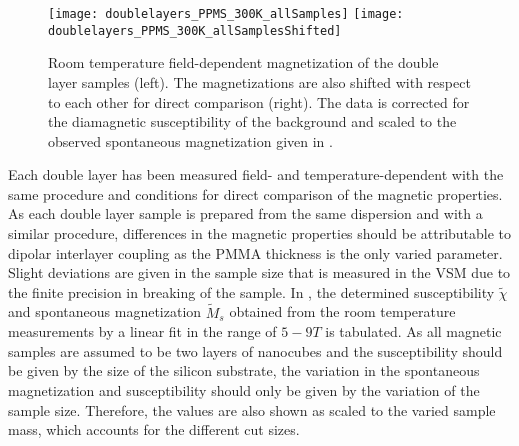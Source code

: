 \documentclass[\main/dresen_thesis.tex]{subfiles}
\begin{document}
  \label{sec:doubleLayers:vsm}

  \begin{figure}[tb]
    \centering
    \texttt{[image: doublelayers\_PPMS\_300K\_allSamples]}
    \texttt{[image: doublelayers\_PPMS\_300K\_allSamplesShifted]}
    \caption{\label{fig:doubleLayers:RTVSM}Room temperature field-dependent magnetization of the double layer samples (left). The magnetizations are also shifted with respect to each other for direct comparison (right). The data is corrected for the diamagnetic susceptibility of the background and scaled to the observed spontaneous magnetization given in .}
  \end{figure}

    Each double layer has been measured field- and temperature-dependent with the same procedure and conditions for direct comparison of the magnetic properties.
    As each double layer sample is prepared from the same dispersion and with a similar procedure, differences in the magnetic properties should be attributable to dipolar interlayer coupling as the PMMA thickness is the only varied parameter.
    Slight deviations are given in the sample size that is measured in the VSM due to the finite precision in breaking of the sample.
    In , the determined susceptibility $\tilde{\chi}$ and spontaneous magnetization $\tilde{M}_s$ obtained from the room temperature measurements by a linear fit in the range of $5 - 9 \unit{T}$ is tabulated.
    As all  magnetic samples are assumed to be two layers of nanocubes and the susceptibility should be given by the size of the silicon substrate, the variation in the spontaneous magnetization and susceptibility should only be given by the variation of the sample size.
    Therefore, the values are also shown as scaled to the varied sample mass, which accounts for the different cut sizes.
\end{document}
